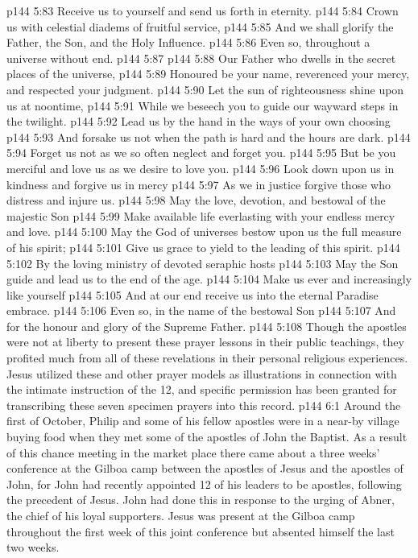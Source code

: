 \vs p144 5:83 \hsetoff Receive us to yourself and send us forth in eternity.
\vs p144 5:84 Crown us with celestial diadems of fruitful service,
\vs p144 5:85 \hsetoff And we shall glorify the Father, the Son, and the Holy Influence.
\vs p144 5:86 Even so, throughout a universe without end.
\vs p144 5:87 \separatorshort
\vs p144 5:88 Our Father who dwells in the secret places of the universe,
\vs p144 5:89 \hsetoff Honoured be your name, reverenced your mercy, and respected your judgment.
\vs p144 5:90 Let the sun of righteousness shine upon us at noontime,
\vs p144 5:91 \hsetoff While we beseech you to guide our wayward steps in the twilight.
\vs p144 5:92 Lead us by the hand in the ways of your own choosing
\vs p144 5:93 \hsetoff And forsake us not when the path is hard and the hours are dark.
\vs p144 5:94 Forget us not as we so often neglect and forget you.
\vs p144 5:95 \hsetoff But be you merciful and love us as we desire to love you.
\vs p144 5:96 Look down upon us in kindness and forgive us in mercy
\vs p144 5:97 \hsetoff As we in justice forgive those who distress and injure us.
\vs p144 5:98 May the love, devotion, and bestowal of the majestic Son
\vs p144 5:99 \hsetoff Make available life everlasting with your endless mercy and love.
\vs p144 5:100 May the God of universes bestow upon us the full measure of his spirit;
\vs p144 5:101 \hsetoff Give us grace to yield to the leading of this spirit.
\vs p144 5:102 By the loving ministry of devoted seraphic hosts
\vs p144 5:103 \hsetoff May the Son guide and lead us to the end of the age.
\vs p144 5:104 Make us ever and increasingly like yourself
\vs p144 5:105 \hsetoff And at our end receive us into the eternal Paradise embrace.
\vs p144 5:106 Even so, in the name of the bestowal Son
\vs p144 5:107 \hsetoff And for the honour and glory of the Supreme Father.
\vspace*{1ex}
\vs p144 5:108 Though the apostles were not at liberty to present these prayer lessons in their public teachings, they profited much from all of these revelations in their personal religious experiences. Jesus utilized these and other prayer models as illustrations in connection with the intimate instruction of the 12, and specific permission has been granted for transcribing these seven specimen prayers into this record.
\vs p144 6:1 Around the first of October, Philip and some of his fellow apostles were in a near\hyp{}by village buying food when they met some of the apostles of John the Baptist. As a result of this chance meeting in the market place there came about a three weeks’ conference at the Gilboa camp between the apostles of Jesus and the apostles of John, for John had recently appointed 12 of his leaders to be apostles, following the precedent of Jesus. John had done this in response to the urging of Abner, the chief of his loyal supporters. Jesus was present at the Gilboa camp throughout the first week of this joint conference but absented himself the last two weeks.
